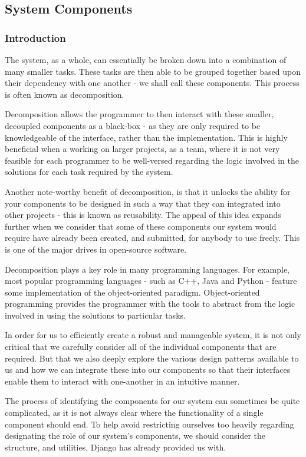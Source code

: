 \subsection*{System Components}
	\subsubsection*{Introduction}
		The system, as a whole, can essentially be broken down into a combination of many smaller tasks. These tasks are then able to be grouped together based upon their dependency with one another - we shall call these components. This process is often known as decomposition.
		
		Decomposition allows the programmer to then interact with these smaller, decoupled components as a black-box - as they are only required to be knowledgeable of the interface, rather than the implementation. This is highly beneficial when a working on larger projects, as a team, where it is not very feasible for each programmer to be well-versed regarding the logic involved in the solutions for each task required by the system.
		
		Another note-worthy benefit of decomposition, is that it unlocks the ability for your components to be designed in such a way that they can integrated into other projects - this is known as reusability. The appeal of this idea expands further when we consider that some of these components our system would require have already been created, and submitted, for anybody to use freely. This is one of the major drives in open-source software.
		
		Decomposition plays a key role in many programming languages. For example, most popular programming languages - such as C++, Java and Python - feature some implementation of the object-oriented paradigm. Object-oriented programming provides the programmer with the tools to abstract from the logic involved in using the solutions to particular tasks.
		
		In order for us to efficiently create a robust and manageable system, it is not only critical that we carefully consider all of the individual components that are required. But that we also deeply explore the various design patterns available to us and how we can integrate these into our components so that their interfaces enable them to interact with one-another in an intuitive manner.
		
		The process of identifying the components for our system can sometimes be quite complicated, as it is not always clear where the functionality of a single component should end. To help avoid restricting ourselves too heavily regarding designating the role of our system's components, we should consider the structure, and utilities, Django has already provided us with.
	
